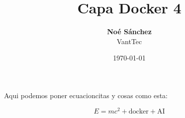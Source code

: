 \documentclass[12pt, a4paper, oneside, notitlepage]{report}
\title{
    \Huge \textbf{Capa Docker 4} \\
}
\author{\textbf{Noé Sánchez} \\ VantTec}
\date{\today}
\begin{document}
\maketitle

Aqui podemos poner ecuacioncitas y cosas como esta:

\begin{equation}
  E = mc^2 + \text{docker} + \text{AI}
\end{equation}
\end{document}
